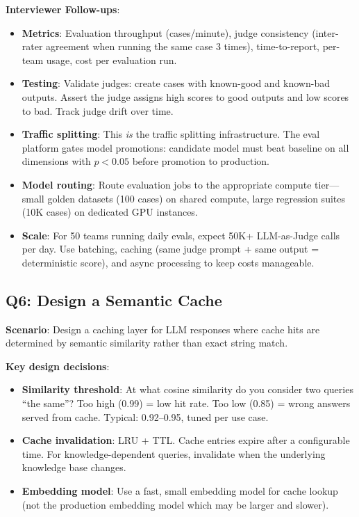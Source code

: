 \textbf{Interviewer Follow-ups}:
\begin{itemize}[leftmargin=*]
    \item \textbf{Metrics}: Evaluation throughput (cases/minute), judge consistency (inter-rater agreement when running the same case 3 times), time-to-report, per-team usage, cost per evaluation run.
    \item \textbf{Testing}: Validate judges: create cases with known-good and known-bad outputs. Assert the judge assigns high scores to good outputs and low scores to bad. Track judge drift over time.
    \item \textbf{Traffic splitting}: This \emph{is} the traffic splitting infrastructure. The eval platform gates model promotions: candidate model must beat baseline on all dimensions with $p < 0.05$ before promotion to production.
    \item \textbf{Model routing}: Route evaluation jobs to the appropriate compute tier---small golden datasets (100 cases) on shared compute, large regression suites (10K cases) on dedicated GPU instances.
    \item \textbf{Scale}: For 50 teams running daily evals, expect 50K+ LLM-as-Judge calls per day. Use batching, caching (same judge prompt + same output = deterministic score), and async processing to keep costs manageable.
\end{itemize}

\subsection{Q6: Design a Semantic Cache}

\textbf{Scenario}: Design a caching layer for LLM responses where cache hits are determined by semantic similarity rather than exact string match.

\textbf{Key design decisions}:
\begin{itemize}[leftmargin=*]
    \item \textbf{Similarity threshold}: At what cosine similarity do you consider two queries ``the same''? Too high (0.99) = low hit rate. Too low (0.85) = wrong answers served from cache. Typical: 0.92--0.95, tuned per use case.
    \item \textbf{Cache invalidation}: LRU + TTL. Cache entries expire after a configurable time. For knowledge-dependent queries, invalidate when the underlying knowledge base changes.
    \item \textbf{Embedding model}: Use a fast, small embedding model for cache lookup (not the production embedding model which may be larger and slower).
\end{itemize}


